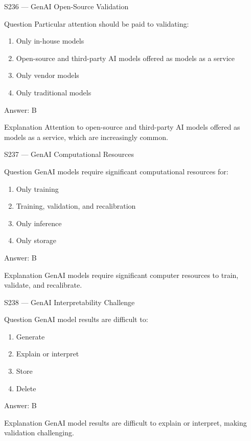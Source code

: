 \documentclass[aspectratio=169,8pt]{beamer}
\begin{document}
	\begin{frame}{S236 --- GenAI Open-Source Validation}
		\begin{block}{Question}
			Particular attention should be paid to validating:
			\begin{enumerate}
				\item Only in-house models
				\item Open-source and third-party AI models offered as models as a service
				\item Only vendor models
				\item Only traditional models
			\end{enumerate}
		\end{block}
		\begin{exampleblock}{Answer: B}\end{exampleblock}
		\begin{block}{Explanation}
			Attention to open-source and third-party AI models offered as models as a service, which are increasingly common.
		\end{block}
	\end{frame}
	
	\begin{frame}{S237 --- GenAI Computational Resources}
		\begin{block}{Question}
			GenAI models require significant computational resources for:
			\begin{enumerate}
				\item Only training
				\item Training, validation, and recalibration
				\item Only inference
				\item Only storage
			\end{enumerate}
		\end{block}
		\begin{exampleblock}{Answer: B}\end{exampleblock}
		\begin{block}{Explanation}
			GenAI models require significant computer resources to train, validate, and recalibrate.
		\end{block}
	\end{frame}
	
	\begin{frame}{S238 --- GenAI Interpretability Challenge}
		\begin{block}{Question}
			GenAI model results are difficult to:
			\begin{enumerate}
				\item Generate
				\item Explain or interpret
				\item Store
				\item Delete
			\end{enumerate}
		\end{block}
		\begin{exampleblock}{Answer: B}\end{exampleblock}
		\begin{block}{Explanation}
			GenAI model results are difficult to explain or interpret, making validation challenging.
		\end{block}
	\end{frame}
	
\end{document}
